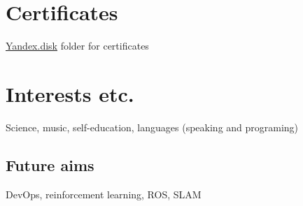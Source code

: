 \documentclass[letterpaper]{twentysecondcv} %
\begin{document}

\section{Certificates}

\href{https://yadi.sk/d/aSyzcZ44-_l-8w?w=1}{Yandex.disk} folder for certificates

\section{Interests etc.}

Science, music, self-education, languages (speaking and programing)

\subsection{Future aims}

DevOps, reinforcement learning, ROS, SLAM







\end{document}
